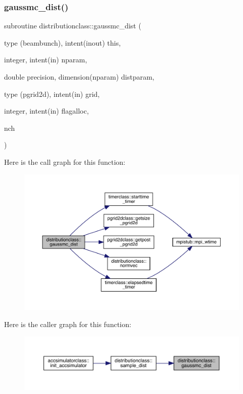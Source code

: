 \subsubsection{\texorpdfstring{gaussmc\_dist()}{gaussmc\_dist()}}
{\footnotesize\ttfamily subroutine distributionclass\+::gaussmc\+\_\+dist (\begin{DoxyParamCaption}\item[{type (beambunch), intent(inout)}]{this,  }\item[{integer, intent(in)}]{nparam,  }\item[{double precision, dimension(nparam)}]{distparam,  }\item[{type (pgrid2d), intent(in)}]{grid,  }\item[{integer, intent(in)}]{flagalloc,  }\item[{}]{nch }\end{DoxyParamCaption})}

Here is the call graph for this function\+:\nopagebreak
\begin{figure}[H]
\begin{center}
\leavevmode
\includegraphics[width=350pt]{namespacedistributionclass_ae3590d26a730b67c67e6e6597196f4bd_cgraph}
\end{center}
\end{figure}
Here is the caller graph for this function\+:\nopagebreak
\begin{figure}[H]
\begin{center}
\leavevmode
\includegraphics[width=350pt]{namespacedistributionclass_ae3590d26a730b67c67e6e6597196f4bd_icgraph}
\end{center}
\end{figure}
\mbox{\label{namespacedistributionclass_a2e96d2c85cac39531d37f2ce057c5766}} 
